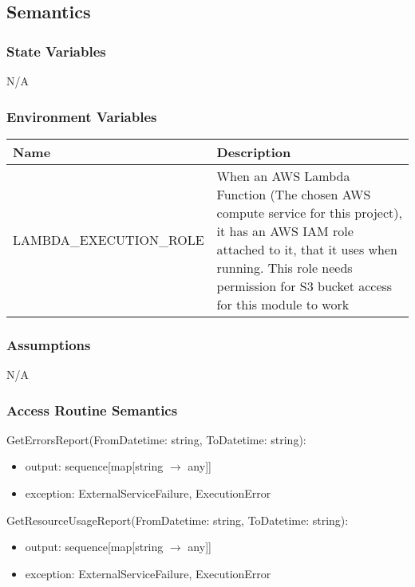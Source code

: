 \documentclass[12pt, titlepage]{article}
\begin{document}
\subsection{Semantics}

\subsubsection{State Variables}

N/A
\subsubsection{Environment Variables}
\begin{center}
  \begin{tabular}{p{6cm} p{10cm}}
    \hline
    \textbf{Name} & \textbf{Description} \\
    \hline
    LAMBDA\_EXECUTION\_ROLE & When an AWS Lambda Function (The chosen
    AWS compute service for this project), it has an AWS IAM role
    attached to it, that it uses when running. This role needs
    permission for S3 bucket access for this module to work \\
    \hline
  \end{tabular}
\end{center}

\subsubsection{Assumptions}

N/A

\subsubsection{Access Routine Semantics}
\noindent GetErrorsReport(FromDatetime: string, ToDatetime: string):
\begin{itemize}
  \item output: sequence[map[string $\rightarrow$ any]]
  \item exception: ExternalServiceFailure, ExecutionError
\end{itemize}

\noindent GetResourceUsageReport(FromDatetime: string, ToDatetime: string):
\begin{itemize}
  \item output: sequence[map[string $\rightarrow$ any]]
  \item exception: ExternalServiceFailure, ExecutionError
\end{itemize}
\end{document}
